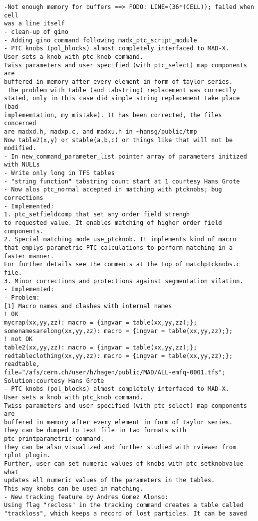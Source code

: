 \begin{verbatim}
-Not enough memory for buffers ==> FODO: LINE=(36*(CELL)); failed when cell
was a line itself
- clean-up of gino
- Adding gino command following madx_ptc_script_module
- PTC knobs (pol_blocks) almost completely interfaced to MAD-X.
User sets a knob with ptc_knob command.
Twiss parameters and user specified (with ptc_select) map components are
buffered in memory after every element in form of taylor series.
 The problem with table (and tabstring) replacement was correctly
stated, only in this case did simple string replacement take place (bad
implememtation, my mistake). It has been corrected, the files concerned
are madxd.h, madxp.c, and madxu.h in ~hansg/public/tmp
Now table2(x,y) or stable(a,b,c) or things like that will not be modified.
- In new_command_parameter_list pointer array of parameters initized with NULLs
- Write only long in TFS tables
- "string function" tabstring count start at 1 courtesy Hans Grote
- Now alos ptc_normal accepted in matching with ptcknobs; bug corrections
- Implemented:
1. ptc_setfieldcomp that set any order field strengh
to requested value. It enables matching of higher order field components.
2. Special matching mode use_ptcknob. It implements kind of macro
that emplys parametric PTC calculations to perform matching in a faster manner.
For further details see the comments at the top of matchptcknobs.c file.
3. Minor corrections and protections against segmentation vilation.
- Implemented:
- Problem:
[1] Macro names and clashes with internal names
! OK
mycrap(xx,yy,zz): macro = {ingvar = table(xx,yy,zz);};
somenamesarelong(xx,yy,zz): macro = {ingvar = table(xx,yy,zz);};
! not OK
table2(xx,yy,zz): macro = {ingvar = table(xx,yy,zz);};
redtableclothing(xx,yy,zz): macro = {ingvar = table(xx,yy,zz);};
readtable,
file="/afs/cern.ch/user/h/hagen/public/MAD/ALL-emfq-0001.tfs";
Solution:courtesy Hans Grote
- PTC knobs (pol_blocks) almost completely interfaced to MAD-X.
User sets a knob with ptc_knob command.
Twiss parameters and user specified (with ptc_select) map components are
buffered in memory after every element in form of taylor series.
They can be dumped to text file in two formats with ptc_printparametric command.
They can be also visualized and further studied with rviewer from rplot plugin.
Further, user can set numeric values of knobs with ptc_setknobvalue what
updates all numeric values of the parameters in the tables.
This way knobs can be used in matching.
- New tracking feature by Andres Gomez Alonso:
Using flag "recloss" in the tracking command creates a table called
"trackloss", which keeps a record of lost particles. It can be saved

\end{verbatim}
